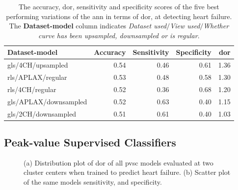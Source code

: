 \begin{table}
    \centering
    \begin{tabular}{lrrrr}
        \toprule
        Dataset-model         &  Accuracy &  Sensitivity &  Specificity &  \acrshort{dor} \\
        \midrule
        gls/4CH/upsampled     &      0.54 &         0.46 &         0.61 & 1.36 \\
        rls/APLAX/regular     &      0.53 &         0.48 &         0.58 & 1.30 \\
        rls/4CH/regular       &      0.52 &         0.36 &         0.68 & 1.20 \\
        gls/APLAX/downsampled &      0.52 &         0.63 &         0.40 & 1.15 \\
        gls/2CH/downsampled   &      0.51 &         0.61 &         0.40 & 1.03 \\
        \bottomrule
    \end{tabular}
    \caption{The accuracy, \acrshort{dor}, sensitivity and specificity scores of the five best performing variations of the \acrshort{ann} in terms of \acrshort{dor}, at detecting heart failure.
             The \textbf{Dataset-model} column indicates \textit{Dataset used}$/$\textit{View used}$/$\textit{Whether curve has been upsampled, downsampled or is regular}.}
    \label{tab:dl_hf_dor_sens_spec_dist}
\end{table}
\newpage

\subsection{Peak-value Supervised Classifiers}

\begin{figure}[htb]
    \centering
    
    \caption{(a) Distribution plot of \acrshort{dor} of all \acrshort{pvsc} models evaluated at two cluster centers when trained to predict heart failure.
             (b) Scatter plot of the same models sensitivity, and specificity.}
    \label{fig:pvmlc_hf_dor_sens_spec_dis}
\end{figure}

